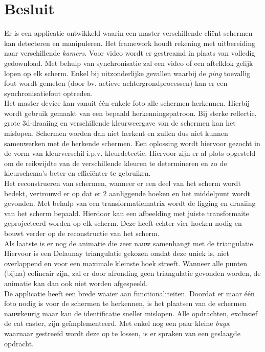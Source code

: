\section{Besluit}
Er is een applicatie ontwikkeld waarin een master verschillende cliënt schermen kan detecteren en manipuleren. Het framework houdt rekening met uitbereiding naar verschillende {\it kamers}. Voor video wordt er gestreamd in plaats van volledig gedownload. Met behulp van synchronisatie zal een video of een aftelklok gelijk lopen op elk scherm. Enkel bij uitzonderlijke gevallen waarbij de {\it ping} toevallig fout wordt gemeten (door bv. actieve achtergrondprocessen) kan er een synchronisatiefout optreden.\\[3mm]
Het master device kan vanuit één enkele foto alle schermen herkennen. Hierbij wordt gebruik gemaakt van een bepaald herkenningspatroon. Bij sterke reflectie, grote 3d-draaiing en verschillende kleurweergave van de schermen kan het mislopen. Schermen worden dan niet herkent en zullen dus niet kunnen samenwerken met de herkende schermen. Een oplossing wordt hiervoor gezocht in de vorm van kleurverschil i.p.v. kleurdetectie. Hiervoor zijn er al plots opgesteld om de reikwijdte van de verschillende kleuren te determineren en zo de kleurschema's beter en efficiënter te gebruiken.\\[3mm]
Het reconstrueren van schermen, wanneer er een deel van het scherm wordt bedekt, vertrouwd er op dat er 2 aanliggende hoeken en het middelpunt wordt gevonden. Met behulp van een transformatiematrix wordt de ligging en draaiing van het scherm bepaald. Hierdoor kan een afbeelding met juiste transformaite geprojecteerd worden op elk scherm. Deze heeft echter vier hoeken nodig en bouwt verder op de reconstructie van het scherm.\\[3mm]
Als laatste is er nog de animatie die zeer nauw samenhangt met de triangulatie. Hiervoor is een Delaunay triangulatie gekozen omdat deze uniek is, niet overlappend en voor een maximale kleinste hoek streeft. Wanneer alle punten (bijna) colineair zijn, zal er door afronding geen triangulatie gevonden worden, de animatie kan dan ook niet worden afgespeeld.\\[3mm]
De applicatie heeft een brede waaier aan functionaliteiten. Doordat er maar één foto nodig is voor de schermen te herkennen, is het plaatsen van de schermen nauwkeurig maar kan de identificatie sneller mislopen. Alle opdrachten, exclusief de cat caster, zijn geïmplementeerd. Met enkel nog een paar kleine {\it bugs}, waarnaar gestreefd wordt deze op te lossen, is er spraken van een geslaagde opdracht.